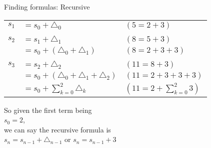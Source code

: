 \begin{intro}{Finding formulas: Recursive}
        \begin{center}
            \begin{tabular}{c l | l}
                $s_{1}$ &   $= s_{0} + \triangle_{0}$                       & $(5 = 2 + 3)$
                \\ \\
                $s_{2}$ &   $= s_{1} + \triangle_{1}$                       & $(8 = 5 + 3)$
                \\
                &           $= s_{0} + (\triangle_{0} + \triangle_{1})$     & $(8 = 2 + 3 + 3)$
                \\ \\
                $s_{3}$ &   $= s_{2} + \triangle_{2}$                       & $(11 = 8 + 3)$
                \\
                &           $= s_{0} + (\triangle_{0} + \triangle_{1} + \triangle_{2})$ & $(11 = 2 + 3 + 3 + 3)$
                \\
                &           $= s_{0} + \sum_{k=0}^{2}{ \triangle_{k} }$     & $(11 = 2 + \sum_{k=0}^{2}{3})$
            \end{tabular}
        \end{center}

        \begin{center}
            So given the first term being \\
            $s_{0} = 2$,
            \\ we can say the recursive formula is \\
            $s_{n} = s_{n-1} + \triangle_{n-1}$ \tab or \tab
            $s_{n} = s_{n-1} + 3$
        \end{center}
        
    \end{intro}

    \newpage

